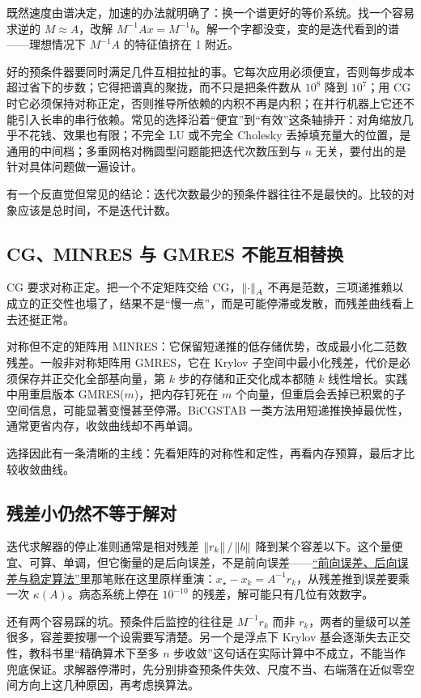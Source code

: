 既然速度由谱决定，加速的办法就明确了：换一个谱更好的等价系统。找一个容易求逆的 \(M\approx A\)，改解 \(M^{-1}Ax=M^{-1}b\)。解一个字都没变，变的是迭代看到的谱——理想情况下 \(M^{-1}A\) 的特征值挤在 1 附近。

好的预条件器要同时满足几件互相拉扯的事。它每次应用必须便宜，否则每步成本超过省下的步数；它得把谱真的聚拢，而不只是把条件数从 \(10^{8}\) 降到 \(10^{7}\)；用 CG 时它必须保持对称正定，否则推导所依赖的内积不再是内积；在并行机器上它还不能引入长串的串行依赖。常见的选择沿着``便宜''到``有效''这条轴排开：对角缩放几乎不花钱、效果也有限；不完全 LU 或不完全 Cholesky 丢掉填充量大的位置，是通用的中间档；多重网格对椭圆型问题能把迭代次数压到与 \(n\) 无关，要付出的是针对具体问题做一遍设计。

有一个反直觉但常见的结论：迭代次数最少的预条件器往往不是最快的。比较的对象应该是总时间，不是迭代计数。

\subsection{CG、MINRES 与 GMRES 不能互相替换}

CG 要求对称正定。把一个不定矩阵交给 CG，\(\left\lVert\cdot\right\rVert_A\) 不再是范数，三项递推赖以成立的正交性也塌了，结果不是``慢一点''，而是可能停滞或发散，而残差曲线看上去还挺正常。

对称但不定的矩阵用 MINRES：它保留短递推的低存储优势，改成最小化二范数残差。一般非对称矩阵用 GMRES，它在 Krylov 子空间中最小化残差，代价是必须保存并正交化全部基向量，第 \(k\) 步的存储和正交化成本都随 \(k\) 线性增长。实践中用重启版本 GMRES(\(m\))，把内存钉死在 \(m\) 个向量，但重启会丢掉已积累的子空间信息，可能显著变慢甚至停滞。BiCGSTAB 一类方法用短递推换掉最优性，通常更省内存，收敛曲线却不再单调。

选择因此有一条清晰的主线：先看矩阵的对称性和定性，再看内存预算，最后才比较收敛曲线。

\subsection{残差小仍然不等于解对}

迭代求解器的停止准则通常是相对残差 \(\left\lVert r_k\right\rVert/\left\lVert b\right\rVert\) 降到某个容差以下。这个量便宜、可算、单调，但它衡量的是后向误差，不是前向误差——\hyperref[sec:08-Numerical-Analysis/01-Floating-Point-and-Error/04]{``前向误差、后向误差与稳定算法''}里那笔账在这里原样重演：\(x_\star-x_k=A^{-1}r_k\)，从残差推到误差要乘一次 \(\kappa(A)\)。病态系统上停在 \(10^{-10}\) 的残差，解可能只有几位有效数字。

还有两个容易踩的坑。预条件后监控的往往是 \(M^{-1}r_k\) 而非 \(r_k\)，两者的量级可以差很多，容差要按哪一个设需要写清楚。另一个是浮点下 Krylov 基会逐渐失去正交性，教科书里``精确算术下至多 \(n\) 步收敛''这句话在实际计算中不成立，不能当作兜底保证。求解器停滞时，先分别排查预条件失效、尺度不当、右端落在近似零空间方向上这几种原因，再考虑换算法。

